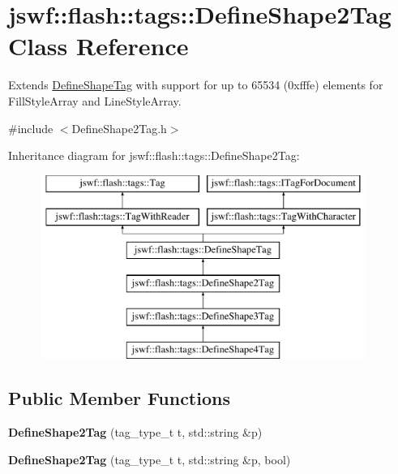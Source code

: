 \hypertarget{classjswf_1_1flash_1_1tags_1_1_define_shape2_tag}{\section{jswf\+:\+:flash\+:\+:tags\+:\+:Define\+Shape2\+Tag Class Reference}
\label{classjswf_1_1flash_1_1tags_1_1_define_shape2_tag}
}


Extends \hyperlink{classjswf_1_1flash_1_1tags_1_1_define_shape_tag}{Define\+Shape\+Tag} with support for up to 65534 (0xfffe) elements for {\ttfamily Fill\+Style\+Array} and {\ttfamily Line\+Style\+Array}.  




{\ttfamily \#include $<$Define\+Shape2\+Tag.\+h$>$}

Inheritance diagram for jswf\+:\+:flash\+:\+:tags\+:\+:Define\+Shape2\+Tag\+:\begin{figure}[H]
\begin{center}
\leavevmode
\includegraphics[height=6.000000cm]{classjswf_1_1flash_1_1tags_1_1_define_shape2_tag}
\end{center}
\end{figure}
\subsection*{Public Member Functions}
\begin{DoxyCompactItemize}
\item 
\hypertarget{classjswf_1_1flash_1_1tags_1_1_define_shape2_tag_a35e1656b28c806bc2d3486fa2023d60f}{{\bfseries Define\+Shape2\+Tag} (tag\+\_\+type\+\_\+t t, std\+::string \&p)}\label{classjswf_1_1flash_1_1tags_1_1_define_shape2_tag_a35e1656b28c806bc2d3486fa2023d60f}

\item 
\hypertarget{classjswf_1_1flash_1_1tags_1_1_define_shape2_tag_a742988a0442ec623d960070026f5ab22}{{\bfseries Define\+Shape2\+Tag} (tag\+\_\+type\+\_\+t t, std\+::string \&p, bool)}\label{classjswf_1_1flash_1_1tags_1_1_define_shape2_tag_a742988a0442ec623d960070026f5ab22}

\end{DoxyCompactItemize}
